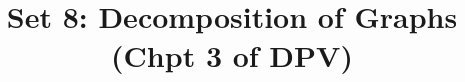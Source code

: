 \documentclass{article}
\begin{document}
\title{Set 8: Decomposition of Graphs (Chpt 3 of DPV)}
\newcommand{\DEF}[1]{{\em #1\/}}

\newcommand\chic{\chi_c}
\newcommand\C{\hbox{${\cal C}$}}
\newcommand{\RR}{\mbox{$\mathbb R$}}
\newcommand{\NN}{\mbox{$\mathbb N$}}
\newcommand{\ZZ}{\mbox{$\mathbb Z$}}
\newcommand{\eopf}{\raisebox{0.8ex}{\framebox{}}}
\newcommand{\dist}{\hbox{\rm d}}
\renewcommand\a{\alpha}
\renewcommand\b{\beta}
\renewcommand\c{\gamma}
\renewcommand\d{\delta}
\newcommand\D{\Delta}
\newcommand{\directedchi}{\mbox{$\vec{\chi}$}}
\newcommand{\directedE}{\mbox{$\vec{E}$}}
\newcommand{\directedG}{\mbox{$\vec{G}$}}
\newcommand{\directedK}{\mbox{$\vec{K}$}}



\maketitle
\end{document}
